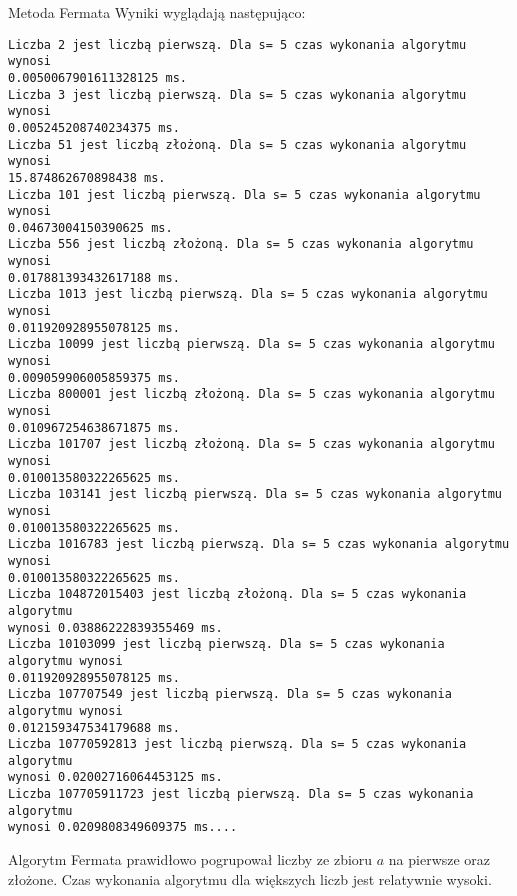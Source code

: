 \documentclass[11pt]{article}
\begin{document}
\begin{section}{Metoda Fermata}
Wyniki wyglądają następująco:
\begin{Verbatim}[commandchars=\\\{\}]
Liczba 2 jest liczbą pierwszą. Dla s= 5 czas wykonania algorytmu wynosi
0.0050067901611328125 ms.
Liczba 3 jest liczbą pierwszą. Dla s= 5 czas wykonania algorytmu wynosi
0.005245208740234375 ms.
Liczba 51 jest liczbą złożoną. Dla s= 5 czas wykonania algorytmu wynosi
15.874862670898438 ms.
Liczba 101 jest liczbą pierwszą. Dla s= 5 czas wykonania algorytmu wynosi
0.04673004150390625 ms.
Liczba 556 jest liczbą złożoną. Dla s= 5 czas wykonania algorytmu wynosi
0.017881393432617188 ms.
Liczba 1013 jest liczbą pierwszą. Dla s= 5 czas wykonania algorytmu wynosi
0.011920928955078125 ms.
Liczba 10099 jest liczbą pierwszą. Dla s= 5 czas wykonania algorytmu wynosi
0.009059906005859375 ms.
Liczba 800001 jest liczbą złożoną. Dla s= 5 czas wykonania algorytmu wynosi
0.010967254638671875 ms.
Liczba 101707 jest liczbą złożoną. Dla s= 5 czas wykonania algorytmu wynosi
0.010013580322265625 ms.
Liczba 103141 jest liczbą pierwszą. Dla s= 5 czas wykonania algorytmu wynosi
0.010013580322265625 ms.
Liczba 1016783 jest liczbą pierwszą. Dla s= 5 czas wykonania algorytmu wynosi
0.010013580322265625 ms.
Liczba 104872015403 jest liczbą złożoną. Dla s= 5 czas wykonania algorytmu
wynosi 0.03886222839355469 ms.
Liczba 10103099 jest liczbą pierwszą. Dla s= 5 czas wykonania algorytmu wynosi
0.011920928955078125 ms.
Liczba 107707549 jest liczbą pierwszą. Dla s= 5 czas wykonania algorytmu wynosi
0.012159347534179688 ms.
Liczba 10770592813 jest liczbą pierwszą. Dla s= 5 czas wykonania algorytmu
wynosi 0.02002716064453125 ms.
Liczba 107705911723 jest liczbą pierwszą. Dla s= 5 czas wykonania algorytmu
wynosi 0.0209808349609375 ms....
    \end{Verbatim}
    Algorytm Fermata prawidłowo pogrupował liczby ze zbioru $a$ na pierwsze oraz złożone. Czas wykonania algorytmu dla większych liczb jest relatywnie wysoki.
    \end{section}
    
\end{document}
